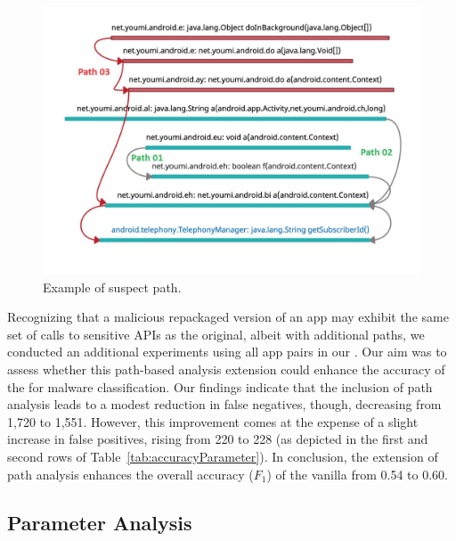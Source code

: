 \begin{figure}
\centering
\includegraphics[scale=0.28]{images/maliciousTrace_example01.pdf}
\caption{Example of suspect path.}
 \label{fig:maliciousTrace}
\end{figure}

Recognizing that a malicious repackaged version of an app may exhibit the same set of calls
to sensitive APIs as the original, albeit with additional paths, we conducted an additional experiments
using all app pairs in our \cds. Our aim was to assess whether this path-based analysis extension could enhance
the accuracy of the \mas for malware classification. Our findings indicate that the inclusion of path analysis
leads to a modest reduction in false negatives, though, decreasing from 1,720 to 1,551.
However, this improvement comes at the expense of a slight increase in false positives, rising from 220 to 228
(as depicted in the first and second rows of Table~\ref{tab:accuracyParameter}).
In conclusion, the extension of path analysis enhances the overall accuracy ($F_1$) of the vanilla
\mas from 0.54 to 0.60.

\subsection{Parameter Analysis}

